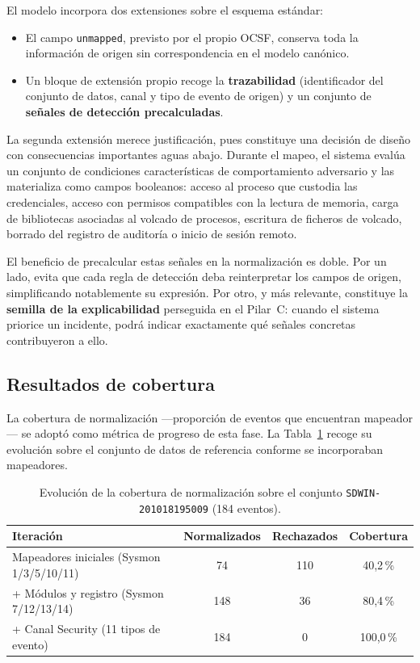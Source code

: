 El modelo incorpora dos extensiones sobre el esquema estándar:

\begin{itemize}
    \item El campo \texttt{unmapped}, previsto por el propio OCSF, conserva toda la
    información de origen sin correspondencia en el modelo canónico.
    \item Un bloque de extensión propio recoge la \textbf{trazabilidad} (identificador del
    conjunto de datos, canal y tipo de evento de origen) y un conjunto de \textbf{señales de
    detección precalculadas}.
\end{itemize}

La segunda extensión merece justificación, pues constituye una decisión de diseño con
consecuencias importantes aguas abajo. Durante el mapeo, el sistema evalúa un conjunto de
condiciones características de comportamiento adversario y las materializa como campos
booleanos: acceso al proceso que custodia las credenciales, acceso con permisos compatibles
con la lectura de memoria, carga de bibliotecas asociadas al volcado de procesos, escritura de
ficheros de volcado, borrado del registro de auditoría o inicio de sesión remoto.

El beneficio de precalcular estas señales en la normalización es doble. Por un lado, evita que
cada regla de detección deba reinterpretar los campos de origen, simplificando notablemente su
expresión. Por otro, y más relevante, constituye la \textbf{semilla de la explicabilidad}
perseguida en el Pilar~C: cuando el sistema priorice un incidente, podrá indicar exactamente
qué señales concretas contribuyeron a ello.

\subsection{Resultados de cobertura}

La cobertura de normalización —proporción de eventos que encuentran mapeador— se adoptó como
métrica de progreso de esta fase. La Tabla~\ref{tab:cobertura} recoge su evolución sobre el
conjunto de datos de referencia conforme se incorporaban mapeadores.

\begin{table}[H]
\centering
\begin{tabular}{|l|c|c|c|}
\hline
\textbf{Iteración} & \textbf{Normalizados} & \textbf{Rechazados} & \textbf{Cobertura} \\
\hline
Mapeadores iniciales (Sysmon 1/3/5/10/11) & 74 & 110 & 40{,}2\,\% \\
+ Módulos y registro (Sysmon 7/12/13/14) & 148 & 36 & 80{,}4\,\% \\
+ Canal Security (11 tipos de evento) & 184 & 0 & 100{,}0\,\% \\
\hline
\end{tabular}
\caption{Evolución de la cobertura de normalización sobre el conjunto \texttt{SDWIN-201018195009} (184 eventos).}
\label{tab:cobertura}
\end{table}


